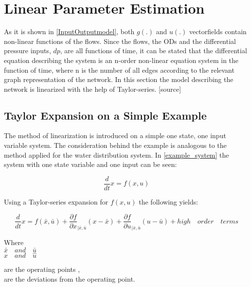 \section{Linear Parameter Estimation} 
\label{LinParamEst}

As it is shown in \eqref{InputOutputmodel}, both $g(.)$ and $u(.)$ vectorfields contain non-linear functions of the flows. Since the flows, the ODs and the differential pressure inputs, $dp$, are all functions of time, it can be stated that the differential equation describing the system is an n-order non-linear equation system in the function of time, where n is the number of all edges according to the relevant graph representation of the network. In this section the model describing the network is linearized with the help of Taylor-series. [source] 

\subsection{Taylor Expansion on a Simple Example}
 \label{Taylorexamplesection}

The method of linearization is introduced on a simple one state, one input variable system. The consideration behind the example is analogous to the method applied for the water distribution system. In \eqref{example_system} the system with one state variable and one input can be seen: 

\begin{equation}
\frac{d}{dt} x = f(x,u)
 \label{example_system}
\end{equation}

Using a Taylor-series expansion for $f(x,u)$ the following yields: 

\begin{equation}
\frac{d}{dt} x = f(\bar{x},\bar{u}) + \frac{\partial f}{\partial x}_{|\bar{x}, \bar{u}} (x-\bar{x}) + \frac{\partial f}{\partial u}_{|\bar{x}, \bar{u}} (u-\bar{u}) + high \quad order \quad terms  
 \label{TaylorExpansion}
\end{equation}

\begin{minipage}[t]{0.20\textwidth}
Where\\
\hspace*{8mm} $\bar{x} \quad and \quad \bar{u}$ \\
\hspace*{8mm} $\hat{x} \quad and \quad \hat{u}$ 
\end{minipage}
\begin{minipage}[t]{0.68\textwidth}
\vspace*{2mm}
are the operating points ,\\
are the deviations from the operating point.
\end{minipage}

